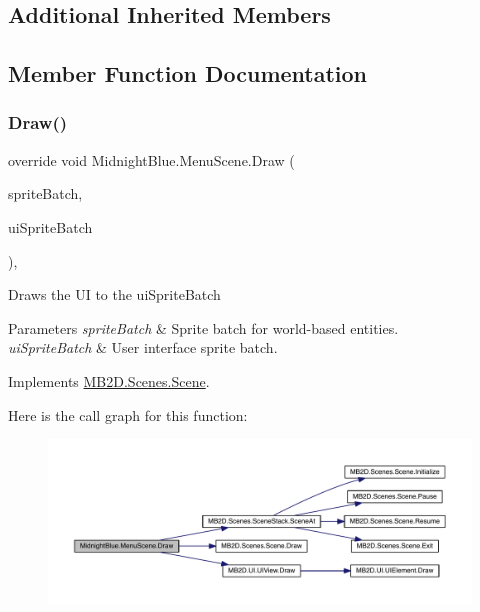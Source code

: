 \subsection*{Additional Inherited Members}


\subsection{Member Function Documentation}
\hypertarget{class_midnight_blue_1_1_menu_scene_a600112073f48c763a50c802960f5fdaa}{}\label{class_midnight_blue_1_1_menu_scene_a600112073f48c763a50c802960f5fdaa} 
\subsubsection{\texorpdfstring{Draw()}{Draw()}}
{\footnotesize\ttfamily override void Midnight\+Blue.\+Menu\+Scene.\+Draw (\begin{DoxyParamCaption}\item[{Sprite\+Batch}]{sprite\+Batch,  }\item[{Sprite\+Batch}]{ui\+Sprite\+Batch }\end{DoxyParamCaption})\hspace{0.3cm}{\ttfamily [inline]}, {\ttfamily [virtual]}}



Draws the UI to the ui\+Sprite\+Batch 


\begin{DoxyParams}{Parameters}
{\em sprite\+Batch} & Sprite batch for world-\/based entities.\\
\hline
{\em ui\+Sprite\+Batch} & User interface sprite batch.\\
\hline
\end{DoxyParams}


Implements \hyperlink{class_m_b2_d_1_1_scenes_1_1_scene_a932d33071ecb4c5187367825dba72324}{M\+B2\+D.\+Scenes.\+Scene}.

Here is the call graph for this function\+:\nopagebreak
\begin{figure}[H]
\begin{center}
\leavevmode
\includegraphics[width=350pt]{class_midnight_blue_1_1_menu_scene_a600112073f48c763a50c802960f5fdaa_cgraph}
\end{center}
\end{figure}
\hypertarget{class_midnight_blue_1_1_menu_scene_acc60288dc2dff4d612b7a63615165de5}{}\label{class_midnight_blue_1_1_menu_scene_acc60288dc2dff4d612b7a63615165de5} 
